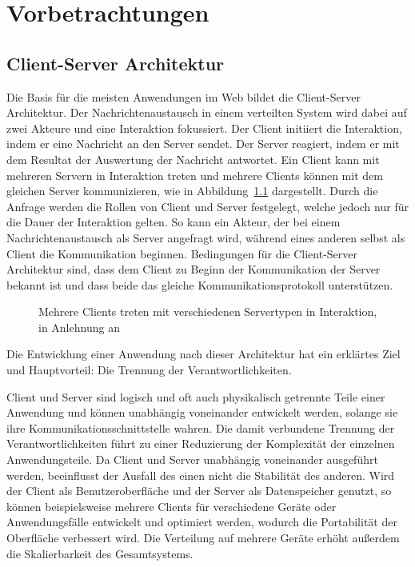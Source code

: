 \chapter{Vorbetrachtungen}
\section{Client-Server Architektur}
Die Basis für die meisten Anwendungen im Web bildet die Client-Server Architektur.
Der Nachrichtenaustausch in einem verteilten System wird dabei auf zwei Akteure und eine Interaktion fokussiert.
Der Client initiiert die Interaktion, indem er eine Nachricht an den Server sendet.
Der Server reagiert, indem er mit dem Resultat der Auswertung der Nachricht antwortet.
Ein Client kann mit mehreren Servern in Interaktion treten und mehrere Clients können mit dem gleichen Server kommunizieren, wie in Abbildung~\ref{img:client-server} dargestellt.
Durch die Anfrage werden die Rollen von Client und Server festgelegt, welche jedoch nur für die Dauer der Interaktion gelten.
So kann ein Akteur, der bei einem Nachrichtenaustausch als Server angefragt wird, während eines anderen selbst als Client die Kommunikation beginnen.
Bedingungen für die Client-Server Architektur sind, dass dem Client zu Beginn der Kommunikation der Server bekannt ist und dass beide das gleiche Kommunikationsprotokoll unterstützen.
\begin{figure}[h]
  \centering
  \caption{Mehrere Clients treten mit verschiedenen Servertypen in Interaktion, in Anlehnung an~\cite[23]{Bengel}}\label{img:client-server}
\end{figure}
\par
Die Entwicklung einer Anwendung nach dieser Architektur hat ein erklärtes Ziel und Hauptvorteil: Die Trennung der Verantwortlichkeiten.\cite[vgl.][78]{REST}
\par
Client und Server sind logisch und oft auch physikalisch getrennte Teile einer Anwendung und können unabhängig voneinander entwickelt werden, solange sie ihre Kommunikationsschnittstelle wahren.
Die damit verbundene Trennung der Verantwortlichkeiten führt zu einer Reduzierung der Komplexität der einzelnen Anwendungsteile.
Da Client und Server unabhängig voneinander ausgeführt werden, beeinflusst der Ausfall des einen nicht die Stabilität des anderen.
Wird der Client als Benutzeroberfläche und der Server als Datenspeicher genutzt, so können beispielsweise mehrere Clients für verschiedene Geräte oder Anwendungsfälle entwickelt und optimiert werden, wodurch die Portabilität der Oberfläche verbessert wird.
Die Verteilung auf mehrere Geräte erhöht außerdem die Skalierbarkeit des Gesamtsystems.

